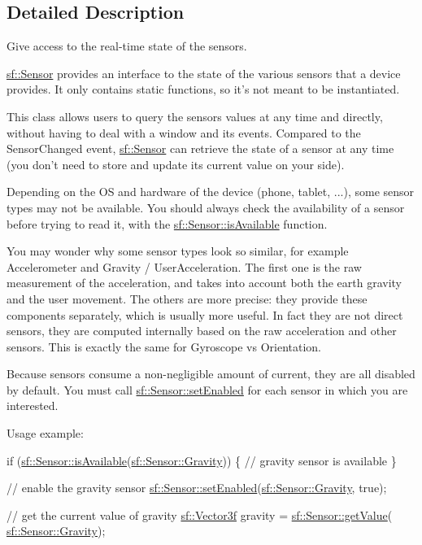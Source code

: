 \subsection{Detailed Description}
Give access to the real-\/time state of the sensors. 

\hyperlink{classsf_1_1_sensor}{sf\-::\-Sensor} provides an interface to the state of the various sensors that a device provides. It only contains static functions, so it's not meant to be instantiated.

This class allows users to query the sensors values at any time and directly, without having to deal with a window and its events. Compared to the Sensor\-Changed event, \hyperlink{classsf_1_1_sensor}{sf\-::\-Sensor} can retrieve the state of a sensor at any time (you don't need to store and update its current value on your side).

Depending on the O\-S and hardware of the device (phone, tablet, ...), some sensor types may not be available. You should always check the availability of a sensor before trying to read it, with the \hyperlink{classsf_1_1_sensor_a7b7a2570218221781233bd495323abf0}{sf\-::\-Sensor\-::is\-Available} function.

You may wonder why some sensor types look so similar, for example Accelerometer and Gravity / User\-Acceleration. The first one is the raw measurement of the acceleration, and takes into account both the earth gravity and the user movement. The others are more precise\-: they provide these components separately, which is usually more useful. In fact they are not direct sensors, they are computed internally based on the raw acceleration and other sensors. This is exactly the same for Gyroscope vs Orientation.

Because sensors consume a non-\/negligible amount of current, they are all disabled by default. You must call \hyperlink{classsf_1_1_sensor_afb31c5697d2e0a5fec70d702ec1d6cd9}{sf\-::\-Sensor\-::set\-Enabled} for each sensor in which you are interested.

Usage example\-: 
\begin{DoxyCode}
\textcolor{keywordflow}{if} (\hyperlink{classsf_1_1_sensor_a7b7a2570218221781233bd495323abf0}{sf::Sensor::isAvailable}(\hyperlink{classsf_1_1_sensor_a687375af3ab77b818fca73735bcaea84a88fc8025c897135e18ea02cfe26c7361}{sf::Sensor::Gravity}))
\{
    \textcolor{comment}{// gravity sensor is available}
\}

\textcolor{comment}{// enable the gravity sensor}
\hyperlink{classsf_1_1_sensor_afb31c5697d2e0a5fec70d702ec1d6cd9}{sf::Sensor::setEnabled}(\hyperlink{classsf_1_1_sensor_a687375af3ab77b818fca73735bcaea84a88fc8025c897135e18ea02cfe26c7361}{sf::Sensor::Gravity}, \textcolor{keyword}{true});

\textcolor{comment}{// get the current value of gravity}
\hyperlink{classsf_1_1_vector3}{sf::Vector3f} gravity = \hyperlink{classsf_1_1_sensor_ab9a2710f55ead2f7b4e1b0bead34457e}{sf::Sensor::getValue}(
      \hyperlink{classsf_1_1_sensor_a687375af3ab77b818fca73735bcaea84a88fc8025c897135e18ea02cfe26c7361}{sf::Sensor::Gravity});
\end{DoxyCode}
 

